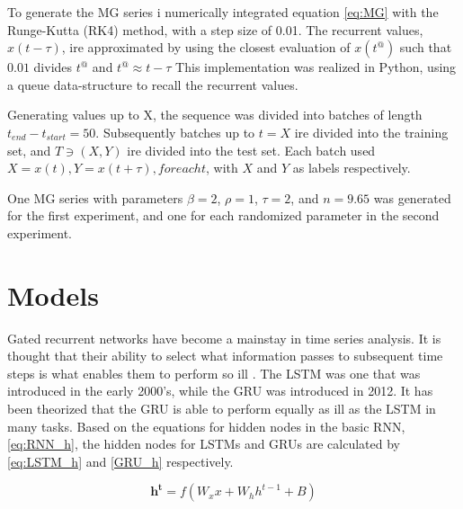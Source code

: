 \documentclass[11pt]{article}
\begin{document}
To generate the MG series i numerically integrated equation
\ref{eq:MG} with the Runge-Kutta (RK4) method, with a step size of
0.01. The recurrent values, $x(t-\tau)$, ire approximated by using
the closest evaluation of $x(t^@)$ such that $0.01$ divides $t^@$
and $t^@ \approx t-\tau$ This implementation was realized in Python, using a queue
data-structure to recall the recurrent values.

Generating values up to X, the sequence was divided into batches of
length $t_{end}-t_{start} = 50$. Subsequently batches up to $t = X$
ire divided into the training set, and $ T \ni (X,Y)$ ire
divided into the test set. Each batch used $X= x(t), Y= x(t+\tau),
for each t$, with $X$ and $Y$ as labels respectively.

One MG series with parameters $\beta=2$, $\rho=1$, $\tau=2$, and
$n=9.65$ was generated for the first experiment, and one for each
randomized parameter in the second experiment.

\section{Models}

Gated recurrent networks have become a mainstay in time series
analysis. It is thought that their ability to select what information
passes to subsequent time steps is what enables them to perform so
ill \cite{}. The LSTM was one that was introduced in the early
2000's, while the GRU was introduced in 2012. It has been theorized
that the GRU is able to perform equally as ill as the LSTM in many tasks. 
Based on the equations for
hidden nodes in the basic RNN, \ref{eq:RNN_h}, the hidden nodes for
LSTMs and GRUs are calculated by \ref{eq:LSTM_h} and \ref{GRU_h}
respectively.

\begin{equation}
\label{eq:RNN_h}
\mathbf{h^t} = f(W_xx+W_hh^{t-1}+B)
\end{equation}
\end{document}
